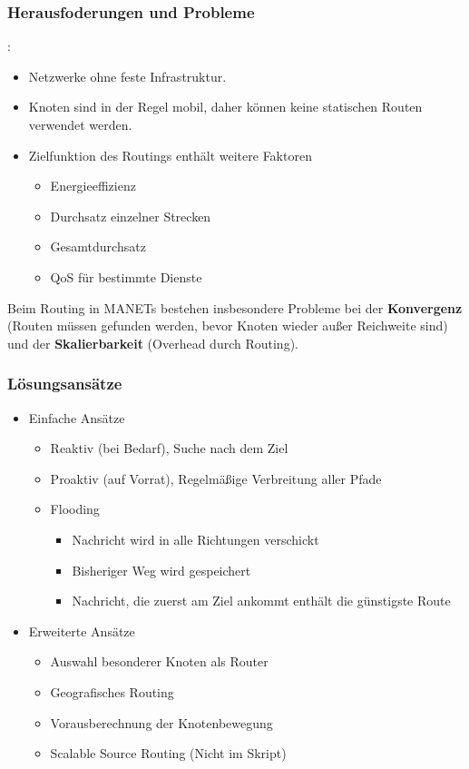 \documentclass{article} %
\begin{document}
\subsubsection{Herausfoderungen und Probleme}:
\begin{itemize}
	\item Netzwerke ohne feste Infrastruktur.
	\item Knoten sind in der Regel mobil, daher können keine statischen Routen verwendet werden.
	\item Zielfunktion des Routings enthält weitere Faktoren
	\begin{itemize}
		\item Energieeffizienz
		\item Durchsatz einzelner Strecken
		\item Gesamtdurchsatz
		\item QoS für bestimmte Dienste
	\end{itemize}
\end{itemize}
Beim Routing in MANETs bestehen insbesondere Probleme bei der \textbf{Konvergenz} (Routen müssen gefunden werden, bevor Knoten wieder außer Reichweite sind) und der \textbf{Skalierbarkeit} (Overhead durch Routing).
\subsubsection{Lösungsansätze}
\begin{itemize}
	\item Einfache Ansätze
	\begin{itemize}
		\item Reaktiv (bei Bedarf), Suche nach dem Ziel
		\item Proaktiv (auf Vorrat), Regelmäßige Verbreitung aller Pfade
		\item Flooding
		\begin{itemize}
			\item Nachricht wird in alle Richtungen verschickt
			\item Bisheriger Weg wird gespeichert
			\item Nachricht, die zuerst am Ziel ankommt enthält die günstigste Route
		\end{itemize}
	\end{itemize}
	\item Erweiterte Ansätze
	\begin{itemize}
		\item Auswahl besonderer Knoten als Router
		\item Geografisches Routing
		\item Vorausberechnung der Knotenbewegung
		\item Scalable Source Routing\cite{fuhrmann2007performance} (Nicht im Skript)
	\end{itemize}
\end{itemize}
\end{document}
